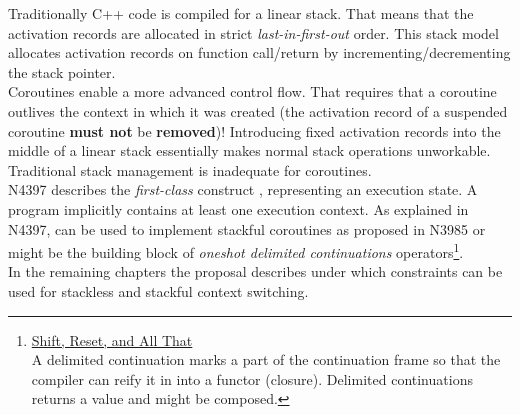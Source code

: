 Traditionally C++ code is compiled for a linear stack. That means that the
activation records are allocated in strict \emph{last-in-first-out} order. This
stack model allocates activation records on function call/return by
incrementing/decrementing the stack pointer.\\
Coroutines enable a more advanced control flow. That requires that a coroutine
outlives the context in which it was created (the activation record of a
suspended coroutine {\bfseries must not} be {\bfseries removed})!
Introducing fixed activation records into the middle of a linear stack
essentially makes normal stack operations unworkable.\\
Traditional stack management is inadequate for coroutines.\\
\newline
N4397\cite{N4397} describes the \emph{first-class} construct \ectx, representing
an execution state. A program implicitly contains at least one execution
context. As explained in N4397, \ectx can be used to implement stackful
coroutines as proposed in N3985\cite{N3985} or might be the building block of
\emph{oneshot delimited continuations}
operators\footnote{\href{https://www.gnu.org/software/guile/manual/html_node/Shift-and-Reset.html}
{Shift, Reset, and All That}\\
A delimited continuation marks a
part of the continuation frame so that the compiler can reify it in into a functor
(closure). Delimited continuations returns a value and might be composed.}.\\
In the remaining chapters the proposal describes under which constraints \ectx
can be used for stackless and stackful context switching.
